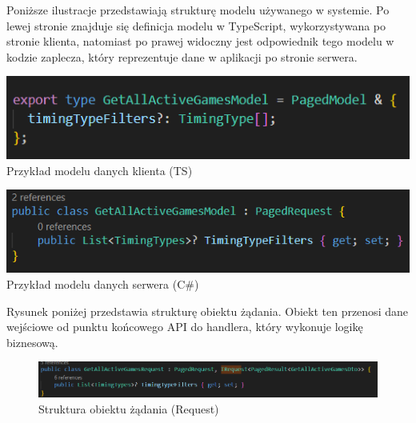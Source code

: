 \documentclass[12pt,a4paper]{article}
\begin{document}
\newpage

\noindent
Poniższe ilustracje przedstawiają strukturę modelu używanego w systemie. Po lewej stronie znajduje się definicja modelu w TypeScript, wykorzystywana po stronie klienta, natomiast po prawej widoczny jest odpowiednik tego modelu w kodzie zaplecza, który reprezentuje dane w aplikacji po stronie serwera.

\vspace{1cm}
\begin{minipage}[t]{0.45\textwidth} 
    \vspace{0pt} 
    \centering 
    \includegraphics[width=\linewidth]{images/ex_model_front.png} 
    Przykład modelu danych klienta (TS)
\end{minipage} 
\hfill 
\begin{minipage}[t]{0.45\textwidth} 
    \vspace{0pt} 
    \centering 
    \includegraphics[width=\linewidth]{images/ex_model_back.png} 
    Przykład modelu danych serwera (C\#)
\end{minipage} 
\vspace{1cm}

\noindent
Rysunek poniżej przedstawia strukturę obiektu żądania. Obiekt ten przenosi dane wejściowe od punktu końcowego API do handlera, który wykonuje logikę biznesową.

\vspace{1cm}
\begin{figure}[h!]
    \centering
    \includegraphics[width=1\textwidth]{images/ex_request_back.png}
    \caption{Struktura obiektu żądania (Request)}
\end{figure}
\vspace{1cm}
\end{document}
